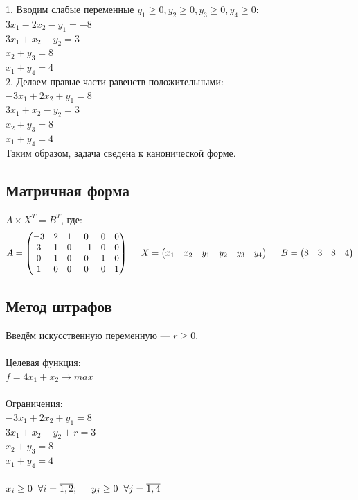 \documentclass[14pt,a4paper,fleqn]{extarticle}
\begin{document}
1. Вводим слабые переменные $y_1 \geq 0, y_2 \geq 0, y_3 \geq 0, y_4 \geq 0$:\\
$3x_1 - 2x_2 - y_1 = -8$\\
$3x_1 + x_2 - y_2 = 3$\\
$x_2 + y_3 = 8$\\
$x_1 + y_4 = 4$\\

2. Делаем правые части равенств положительными:\\
$-3x_1 + 2x_2 + y_1 = 8$\\
$3x_1 + x_2 - y_2 = 3$\\
$x_2 + y_3 = 8$\\
$x_1 + y_4 = 4$\\

Таким образом, задача сведена к канонической форме.

\subsection*{Матричная форма}
$A \times X^T = B^T$, где:
\begin{align*}
	A = \begin{pmatrix}
		-3 & 2 & 1 & 0 & 0 & 0\\
		3 & 1 & 0 & -1 & 0 & 0\\
		0 & 1 & 0 & 0 & 1 & 0\\
		1 & 0 & 0 & 0 & 0 & 1\\
	\end{pmatrix}
	\hspace{0.5cm}
	X = \begin{pmatrix}
		x_1 & x_2 & y_1 & y_2 & y_3 & y_4
	\end{pmatrix}
	\hspace{0.5cm}
	B = \begin{pmatrix}
		8 & 3 & 8 & 4
	\end{pmatrix}
\end{align*}
\newpage
\subsection*{Метод штрафов}
Введём искусственную переменную --- $r \geq 0$.\\\\
Целевая функция:\\
$f = 4x_1+x_2 \longrightarrow max$\\\\
Ограничения:\\
$-3x_1 + 2x_2 + y_1 = 8$\\
$3x_1 + x_2 - y_2 + r = 3$\\
$x_2 + y_3 = 8$\\
$x_1 + y_4 = 4$\\\\
$x_i \geq 0 \hspace{0.2cm} \forall i = \overline{1,2}; \hspace{0.5cm} y_j \geq 0 \hspace{0.2cm} \forall j =  \overline{1,4}$\\
\end{document}
